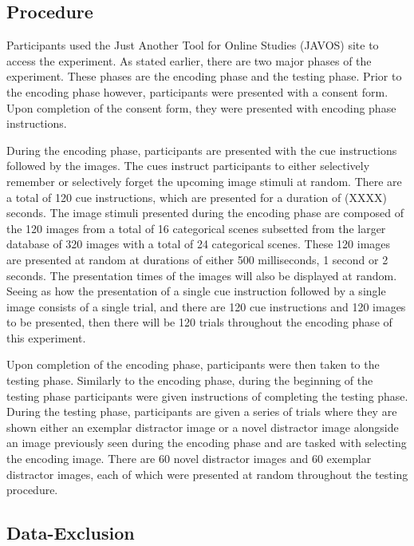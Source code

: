 \documentclass[
  english,
  man,floatsintext]{apa6}
\begin{document}
\hypertarget{procedure}{%
\subsection{Procedure}\label{procedure}}

Participants used the Just Another Tool for Online Studies (JAVOS) site to access the experiment. As stated earlier, there are two major phases of the experiment. These phases are the encoding phase and the testing phase. Prior to the encoding phase however, participants were presented with a consent form. Upon completion of the consent form, they were presented with encoding phase instructions.

During the encoding phase, participants are presented with the cue instructions followed by the images. The cues instruct participants to either selectively remember or selectively forget the upcoming image stimuli at random. There are a total of 120 cue instructions, which are presented for a duration of (XXXX) seconds. The image stimuli presented during the encoding phase are composed of the 120 images from a total of 16 categorical scenes subsetted from the larger database of 320 images with a total of 24 categorical scenes. These 120 images are presented at random at durations of either 500 milliseconds, 1 second or 2 seconds. The presentation times of the images will also be displayed at random. Seeing as how the presentation of a single cue instruction followed by a single image consists of a single trial, and there are 120 cue instructions and 120 images to be presented, then there will be 120 trials throughout the encoding phase of this experiment.

Upon completion of the encoding phase, participants were then taken to the testing phase. Similarly to the encoding phase, during the beginning of the testing phase participants were given instructions of completing the testing phase. During the testing phase, participants are given a series of trials where they are shown either an exemplar distractor image or a novel distractor image alongside an image previously seen during the encoding phase and are tasked with selecting the encoding image. There are 60 novel distractor images and 60 exemplar distractor images, each of which were presented at random throughout the testing procedure.

\hypertarget{data-exclusion}{%
\subsection{Data-Exclusion}\label{data-exclusion}}
\end{document}
